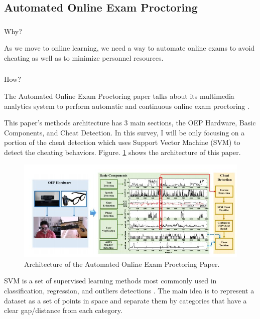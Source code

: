 \documentclass[conference]{IEEEtran}
\begin{document}

\subsection{Automated Online Exam Proctoring}
\subsubsection{}Why?

As we move to online learning, we need a way to automate online exams to avoid cheating as well as to minimize personnel resources.

\subsubsection{}How? 

The Automated Online Exam Proctoring paper talks about its multimedia analytics system to perform automatic and continuous online exam proctoring \cite{b3}.

This paper’s methods architecture has 3 main sections, the OEP Hardware, Basic Components, and Cheat Detection. In this survey, I will be only focusing on a portion of the cheat detection which uses Support Vector Machine (SVM) to detect the cheating behaviors. Figure. \ref{AOE1} shows the architecture of this paper.

\begin{figure}[htbp]
\includegraphics[width=\columnwidth]{AOE_1.JPG}
\caption{Architecture of the Automated Online Exam Proctoring Paper.}
\label{AOE1}
\end{figure}

SVM is a set of supervised learning methods most commonly used in classification, regression, and outliers detections \cite{b4}. The main idea is to represent a dataset as a set of points in space and separate them by categories that have a clear gap/distance from each category.
\end{document}

